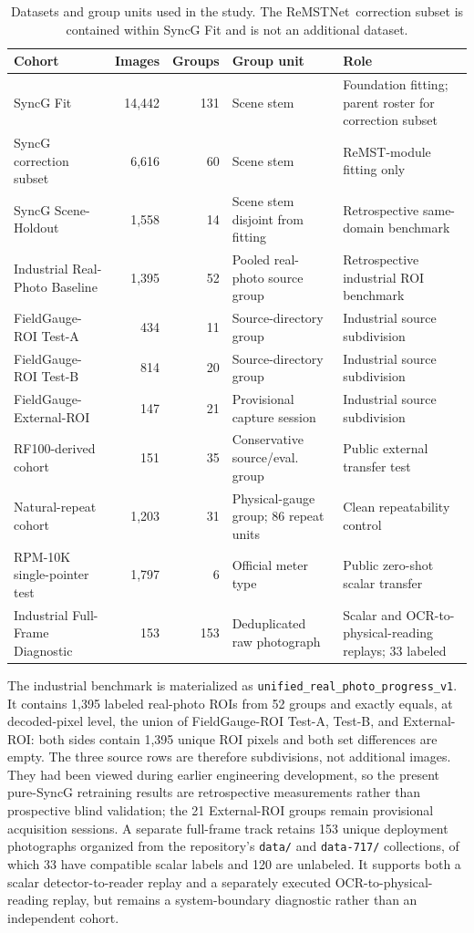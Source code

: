 \documentclass[electronics,article,submit,oneauthor]{Definitions/mdpi}
\newcommand{\modelname}{ReMSTNet}
\begin{document}
\begin{table}[H]
\caption{Datasets and group units used in the study. The \modelname\ correction subset is contained within SyncG Fit and is not an additional dataset.}
\label{tab:data}
\centering
\small
\begin{tabularx}{\textwidth}{lrr>{\raggedright\arraybackslash}X>{\raggedright\arraybackslash}X}
\toprule
\textbf{Cohort} & \textbf{Images} & \textbf{Groups} & \textbf{Group unit} & \textbf{Role} \\
\midrule
SyncG Fit & 14,442 & 131 & Scene stem & Foundation fitting; parent roster for correction subset \\
SyncG correction subset & 6,616 & 60 & Scene stem & ReMST-module fitting only \\
SyncG Scene-Holdout & 1,558 & 14 & Scene stem disjoint from fitting & Retrospective same-domain benchmark \\
Industrial Real-Photo Baseline & 1,395 & 52 & Pooled real-photo source group & Retrospective industrial ROI benchmark \\
FieldGauge-ROI Test-A & 434 & 11 & Source-directory group & Industrial source subdivision \\
FieldGauge-ROI Test-B & 814 & 20 & Source-directory group & Industrial source subdivision \\
FieldGauge-External-ROI & 147 & 21 & Provisional capture session & Industrial source subdivision \\
RF100-derived cohort & 151 & 35 & Conservative source/eval. group & Public external transfer test \\
Natural-repeat cohort & 1,203 & 31 & Physical-gauge group; 86 repeat units & Clean repeatability control \\
RPM-10K single-pointer test & 1,797 & 6 & Official meter type & Public zero-shot scalar transfer \\
Industrial Full-Frame Diagnostic & 153 & 153 & Deduplicated raw photograph & Scalar and OCR-to-physical-reading replays; 33 labeled \\
\bottomrule
\end{tabularx}
\end{table}

The industrial benchmark is materialized as \texttt{unified\_real\_photo\_progress\_v1}. It contains 1,395 labeled real-photo ROIs from 52 groups and exactly equals, at decoded-pixel level, the union of FieldGauge-ROI Test-A, Test-B, and External-ROI: both sides contain 1,395 unique ROI pixels and both set differences are empty. The three source rows are therefore subdivisions, not additional images. They had been viewed during earlier engineering development, so the present pure-SyncG retraining results are retrospective measurements rather than prospective blind validation; the 21 External-ROI groups remain provisional acquisition sessions. A separate full-frame track retains 153 unique deployment photographs organized from the repository's \texttt{data/} and \texttt{data-717/} collections, of which 33 have compatible scalar labels and 120 are unlabeled. It supports both a scalar detector-to-reader replay and a separately executed OCR-to-physical-reading replay, but remains a system-boundary diagnostic rather than an independent cohort.
\end{document}
